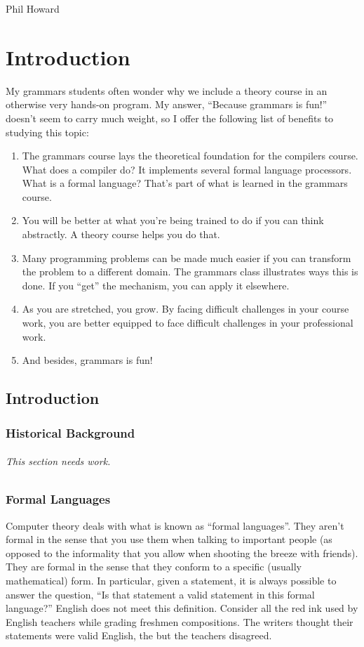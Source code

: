 \documentclass[letterpaper,12pt,openany,reqno]{book}%
\newcommand{\needswork}{\paragraph{This section needs work.}}
\begin{document}
Phil Howard
\mainmatter
\setlength{\parindent}{0cm} %
\setlength{\parskip}{8pt plus 2pt minus 2pt}

\part{Introduction}
My grammars students often wonder why we include a theory course in an otherwise very hands-on program. My answer, ``Because grammars is fun!'' doesn't seem to carry much weight, so I offer the following list of benefits to studying this topic:

\begin{enumerate}
\item The grammars course lays the theoretical foundation for the compilers course. What does a compiler do? It implements several formal language processors. What is a formal language? That's part of what is learned in the grammars course.
\item You will be better at what you're being trained to do if you can think abstractly. A theory course helps you do that.
\item Many programming problems can be made much easier if you can transform the problem to a different domain. The grammars class illustrates ways this is done. If you ``get'' the mechanism, you can apply it elsewhere.
\item As you are stretched, you grow. By facing difficult challenges in your course work, you are better equipped to face difficult challenges in your professional work.
\item And besides, grammars is fun!
\end{enumerate}

\chapter{Introduction}
\section{Historical Background}
\needswork
\section{Formal Languages}
Computer theory deals with what is known as ``formal languages''. They aren't formal in the sense that you use them when talking to important people (as opposed to the informality that you allow when shooting the breeze with friends). They are formal in the sense that they conform to a specific (usually mathematical) form. In particular, given a statement, it is always possible to answer the question, ``Is that statement a valid statement in this formal language?'' English does not meet this definition. Consider all the red ink used by English teachers while grading freshmen compositions. The writers thought their statements were valid English, the but the teachers disagreed.
\end{document}
